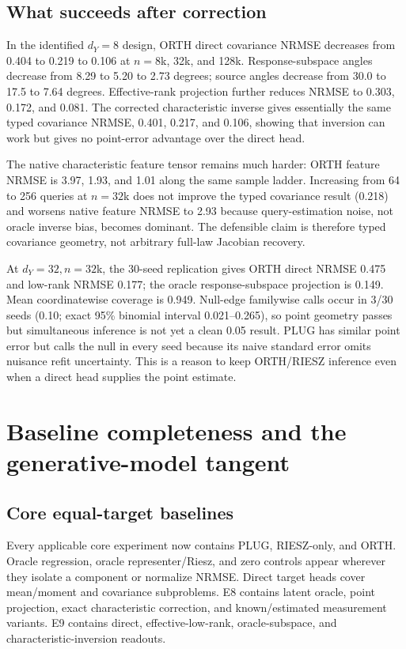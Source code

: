 \documentclass[10.5pt]{article}
\begin{document}
\subsection{What succeeds after correction}

In the identified $d_Y=8$ design, ORTH direct covariance NRMSE decreases from 0.404 to 0.219 to 0.106 at $n=8$k, 32k, and 128k.  Response-subspace angles decrease from 8.29 to 5.20 to 2.73 degrees; source angles decrease from 30.0 to 17.5 to 7.64 degrees.  Effective-rank projection further reduces NRMSE to 0.303, 0.172, and 0.081.  The corrected characteristic inverse gives essentially the same typed covariance NRMSE, 0.401, 0.217, and 0.106, showing that inversion can work but gives no point-error advantage over the direct head.

The native characteristic feature tensor remains much harder: ORTH feature NRMSE is 3.97, 1.93, and 1.01 along the same sample ladder.  Increasing from 64 to 256 queries at $n=32$k does not improve the typed covariance result (0.218) and worsens native feature NRMSE to 2.93 because query-estimation noise, not oracle inverse bias, becomes dominant.  The defensible claim is therefore typed covariance geometry, not arbitrary full-law Jacobian recovery.

At $d_Y=32,n=32$k, the 30-seed replication gives ORTH direct NRMSE 0.475 and low-rank NRMSE 0.177; the oracle response-subspace projection is 0.149.  Mean coordinatewise coverage is 0.949.  Null-edge familywise calls occur in 3/30 seeds (0.10; exact 95\% binomial interval 0.021--0.265), so point geometry passes but simultaneous inference is not yet a clean 0.05 result.  PLUG has similar point error but calls the null in every seed because its naive standard error omits nuisance refit uncertainty.  This is a reason to keep ORTH/RIESZ inference even when a direct head supplies the point estimate.

\section{Baseline completeness and the generative-model tangent}

\subsection{Core equal-target baselines}

Every applicable core experiment now contains PLUG, RIESZ-only, and ORTH.  Oracle regression, oracle representer/Riesz, and zero controls appear wherever they isolate a component or normalize NRMSE.  Direct target heads cover mean/moment and covariance subproblems.  E8 contains latent oracle, point projection, exact characteristic correction, and known/estimated measurement variants.  E9 contains direct, effective-low-rank, oracle-subspace, and characteristic-inversion readouts.
\end{document}
